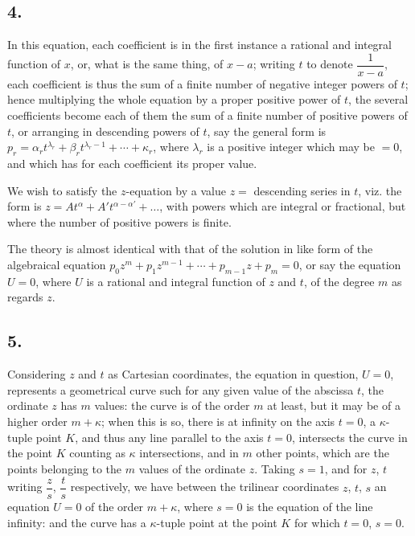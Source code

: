 \documentclass[11pt,a4paper]{article}
\theoremstyle{definition}
\begin{document}
\subsection*{4.}

In this equation, each coefficient is in the first instance a rational and integral function of $x$, or, what is the same thing, of $x - a$; writing $t$ to denote $\dfrac{1}{x - a}$, each coefficient is thus the sum of a finite number of negative integer powers of $t$; hence multiplying the whole equation by a proper positive power of $t$, the several coefficients become each of them the sum of a finite number of positive powers of $t$, or arranging in descending powers of $t$, say the general form is $p_r = \alpha_r t^{\lambda_r} + \beta_r t^{\lambda_r - 1} + \cdots + \kappa_r$, where $\lambda_r$ is a positive integer which may be $= 0$, and which has for each coefficient its proper value.

We wish to satisfy the $z$-equation by a value $z =$ descending series in $t$, viz. the form is $z = At^\alpha + A' t^{\alpha - \alpha'} + \ldots$, with powers which are integral or fractional, but where the number of positive powers is finite.

The theory is almost identical with that of the solution in like form of the algebraical equation $p_0 z^m + p_1 z^{m-1} + \cdots + p_{m-1}z + p_m = 0$, or say the equation $U = 0$, where $U$ is a rational and integral function of $z$ and $t$, of the degree $m$ as regards $z$.

\subsection*{5.}

Considering $z$ and $t$ as Cartesian coordinates, the equation in question, $U = 0$, represents a geometrical curve such for any given value of the abscissa $t$, the ordinate $z$ has $m$ values: the curve is of the order $m$ at least, but it may be of a higher order $m + \kappa$; when this is so, there is at infinity on the axis $t = 0$, a $\kappa$-tuple point $K$, and thus any line parallel to the axis $t = 0$, intersects the curve in the point $K$ counting as $\kappa$ intersections, and in $m$ other points, which are the points belonging to the $m$ values of the ordinate $z$. Taking $s = 1$, and for $z$, $t$ writing $\dfrac{z}{s}$, $\dfrac{t}{s}$ respectively, we have between the trilinear coordinates $z$, $t$, $s$ an equation $U = 0$ of the order $m + \kappa$, where $s = 0$ is the equation of the line infinity: and the curve has a $\kappa$-tuple point at the point $K$ for which $t = 0$, $s = 0$.
\end{document}
